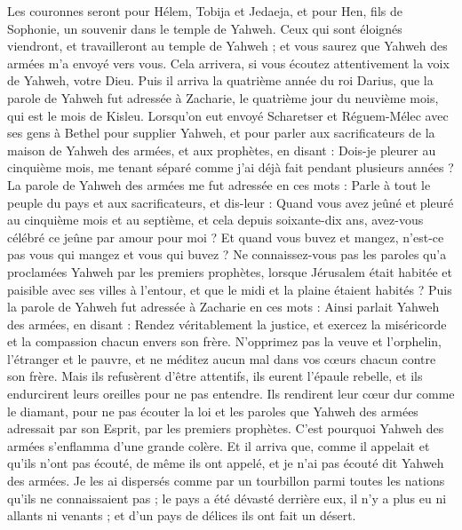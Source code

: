 \begin{multicols}{2}
Les couronnes seront pour Hélem, Tobija et Jedaeja, et pour Hen, fils de Sophonie, un souvenir dans le temple de Yahweh.
Ceux qui sont éloignés viendront, et travailleront au temple de Yahweh ; et vous saurez que Yahweh des armées m'a envoyé vers vous. Cela arrivera, si vous écoutez attentivement la voix de Yahweh, votre Dieu.
\VerseOne{}Puis il arriva la quatrième année du roi Darius, que la parole de Yahweh fut adressée à Zacharie, le quatrième jour du neuvième mois, qui est le mois de Kisleu.
Lorsqu'on eut envoyé Scharetser et Réguem-Mélec avec ses gens à Bethel pour supplier Yahweh,
et pour parler aux sacrificateurs de la maison de Yahweh des armées, et aux prophètes, en disant : Dois-je pleurer au cinquième mois, me tenant séparé comme j'ai déjà fait pendant plusieurs années ?
La parole de Yahweh des armées me fut adressée en ces mots :
Parle à tout le peuple du pays et aux sacrificateurs, et dis-leur : Quand vous avez jeûné et pleuré au cinquième mois et au septième, et cela depuis soixante-dix ans, avez-vous célébré ce jeûne par amour pour moi ?
Et quand vous buvez et mangez, n'est-ce pas vous qui mangez et vous qui buvez ?
Ne connaissez-vous pas les paroles qu'a proclamées Yahweh par les premiers prophètes, lorsque Jérusalem était habitée et paisible avec ses villes à l'entour, et que le midi et la plaine étaient habités ?
Puis la parole de Yahweh fut adressée à Zacharie en ces mots :
Ainsi parlait Yahweh des armées, en disant : Rendez véritablement la justice, et exercez la miséricorde et la compassion chacun envers son frère.
N'opprimez pas la veuve et l'orphelin, l'étranger et le pauvre, et ne méditez aucun mal dans vos cœurs chacun contre son frère.
Mais ils refusèrent d'être attentifs, ils eurent l'épaule rebelle, et ils endurcirent leurs oreilles pour ne pas entendre.
Ils rendirent leur cœur dur comme le diamant, pour ne pas écouter la loi et les paroles que Yahweh des armées adressait par son Esprit, par les premiers prophètes. C'est pourquoi Yahweh des armées s'enflamma d'une grande colère.
Et il arriva que, comme il appelait et qu'ils n'ont pas écouté, de même ils ont appelé, et je n'ai pas écouté dit Yahweh des armées.
Je les ai dispersés comme par un tourbillon parmi toutes les nations qu'ils ne connaissaient pas ; le pays a été dévasté derrière eux, il n'y a plus eu ni allants ni venants ; et d'un pays de délices ils ont fait un désert.

\end{multicols}
